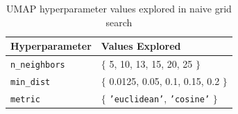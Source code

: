 \documentclass[10pt,oneside]{report}
\begin{document}
\begin{table}[htbp]
    \fontsize{8}{11}\selectfont %
    \centering
    \renewcommand{\arraystretch}{1.2} %
    \begin{tabular}{p{3cm}|p{8.5cm}} %
        \toprule %
        \textbf{Hyperparameter} & \textbf{Values Explored} \\ %
        \midrule %
        \texttt{n\_neighbors} & $\big\{$ 5, 10, 13, 15, 20, 25 $\big\}$ \\ %
        \texttt{min\_dist}    & $\big\{$ 0.0125, 0.05, 0.1, 0.15, 0.2 $\big\}$\\ %
        \texttt{metric}       & $\big\{$ \texttt{'euclidean'}, \texttt{'cosine'} $\big\}$\\ %
        \bottomrule %
    \end{tabular}
    \renewcommand{\arraystretch}{1.0} %
    \caption{UMAP hyperparameter values explored in naive grid search} %
    \label{tab:umapgrid} %
\end{table}




\end{document}
